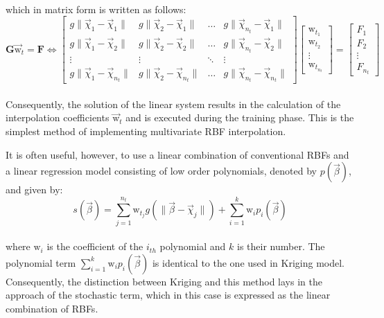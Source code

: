 \\[-0.2cm]
which in matrix form is written as follows:
\\[-0.1cm]
\begin{equation}\label{RBF_no_poly_matrix}
\mathbf{G} \vec{\mathrm{w}}_{t} = \mathbf{F} \Leftrightarrow
\begin{bmatrix}
g \lVert \vec{χ}_{1} - \vec{χ}_{1} \rVert  
& g \lVert \vec{χ}_{2} - \vec{χ}_{1} \rVert & \ldots 
& g \lVert \vec{χ}_{n_{t}} - \vec{χ}_{1} \rVert 
\\
g \lVert \vec{χ}_{1} - \vec{χ}_{2} \rVert   
& g \lVert \vec{χ}_{2} - \vec{χ}_{2} \rVert  & \ldots 
& g \lVert \vec{χ}_{n_{t}} - \vec{χ}_{2} \rVert
\\
\vdots & \vdots & \ddots & \vdots 
\\
g \lVert \vec{χ}_{1} - \vec{χ}_{n_{t}} \rVert   
& g \lVert \vec{χ}_{2} - \vec{χ}_{n_{t}} \rVert & \ldots 
& g \lVert \vec{χ}_{n_{t}} - \vec{χ}_{n_{t}} \rVert
\end{bmatrix}
\begin{bmatrix} 
\mathrm{w}_{t_{1}} \\ \mathrm{w}_{t_{2}} \\ \vdots \\ 
\mathrm{w}_{t_{n_{t}}}
\end{bmatrix}  
=  
\begin{bmatrix} 
F_{1} \\ F_{2} \\ \vdots \\ F_{n_{t}} 
\end{bmatrix}
\end{equation}
\\[-2mm]
Consequently, the solution of the linear system results
in the calculation of the interpolation coefficients 
$\vec{\mathrm{w}}_{t}$ and is executed during the training 
phase. This is the simplest method of implementing 
multivariate RBF interpolation. 

It is often useful, however, to use a linear combination 
of conventional RBFs and a linear regression model 
consisting of low order polynomials, denoted by $p(\vec{β})$, and 
given by\cite{RBF2}: 
\begin{equation}\label{RBF_poly_linear}
s(\vec{β}) =  \sum_{j=1}^{n_{t}} 
\mathrm{w}_{t_{j}} g \left( \lVert \vec{β} - \vec{χ}_{j} 
\rVert \right) +
\sum_{i=1}^{k}{\mathrm{w}_{i}} p_{i}(\vec{β}) 
\end{equation}
\\[-0.1cm] 
where $\mathrm{w}_{i}$ is the coefficient of the $i_{th}$ 
polynomial and $k$ is their number. The polynomial term 
$\sum_{i=1}^{k}{\mathrm{w}_{i}} p_{i}(\vec{β})$ is 
identical to the one used in Kriging model. Consequently, 
the distinction between Kriging and this method lays in the 
approach of the stochastic term, which in this case is 
expressed as the linear combination of RBFs.
\newpage


